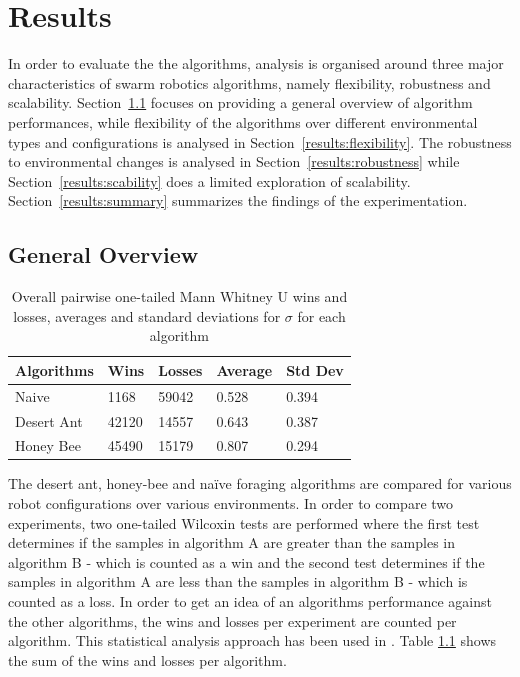 \chapter{Results}
\label{chap:results}

In order to evaluate the the algorithms, analysis is organised around three major characteristics of swarm robotics algorithms, namely flexibility, robustness and scalability. Section~\ref{overview} focuses on providing a general overview of algorithm performances, while flexibility of the algorithms over different environmental types and configurations is analysed in Section~\ref{results:flexibility}. The robustness to environmental changes is analysed in Section~\ref{results:robustness} while Section~\ref{results:scability} does a limited exploration of scalability. Section~\ref{results:summary} summarizes the findings of the experimentation. 

\section{General Overview}
\label{overview}

\begin{table}
\centering
    \caption{Overall pairwise one-tailed Mann Whitney U wins and losses, averages and standard deviations for $\sigma$ for each algorithm}
        \label{summarytable}
    \begin{tabular}{l|llll}
    \hline \hline
    Algorithms & Wins & Losses & Average & Std Dev \\ \hline
    Naive      & 1168    & 59042 & 0.528   & 0.394  \\
    Desert Ant  & 42120 & 14557 & 0.643   & 0.387  \\
    Honey Bee   & 45490 & 15179 & 0.807   & 0.294  \\
    \hline
    \end{tabular}
\end{table}

The desert ant, honey-bee and na\"ive foraging algorithms are compared for various robot configurations over various environments. In order to compare two experiments, two one-tailed Wilcoxin tests are performed where the first test determines if the samples in algorithm A are greater than the samples in algorithm B - which is counted as a win and the second test determines if the samples in algorithm A are less than the samples in algorithm B - which is counted as a loss. In order to get an idea of an algorithms performance against the other algorithms, the wins and losses per experiment are counted per algorithm. This statistical analysis approach has been used in \cite{helbig2013performance}. Table \ref{summarytable} shows the sum of the wins and losses per algorithm.

